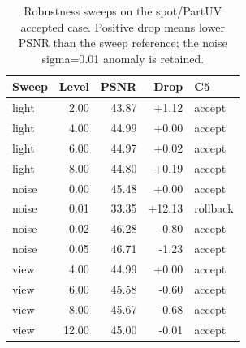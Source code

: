 \begin{table}[t]
\centering
\scriptsize
\caption{Robustness sweeps on the spot/PartUV accepted case. Positive drop means lower PSNR than the sweep reference; the noise sigma=0.01 anomaly is retained.}
\label{tab:robustness}
\begin{tabular}{@{}lrrrl@{}}
\toprule
Sweep & Level & PSNR & Drop & C5 \\
\midrule
light & 2.00 & 43.87 & +1.12 & accept \\
light & 4.00 & 44.99 & +0.00 & accept \\
light & 6.00 & 44.97 & +0.02 & accept \\
light & 8.00 & 44.80 & +0.19 & accept \\
noise & 0.00 & 45.48 & +0.00 & accept \\
noise & 0.01 & 33.35 & +12.13 & rollback \\
noise & 0.02 & 46.28 & -0.80 & accept \\
noise & 0.05 & 46.71 & -1.23 & accept \\
view & 4.00 & 44.99 & +0.00 & accept \\
view & 6.00 & 45.58 & -0.60 & accept \\
view & 8.00 & 45.67 & -0.68 & accept \\
view & 12.00 & 45.00 & -0.01 & accept \\
\bottomrule
\end{tabular}
\end{table}
